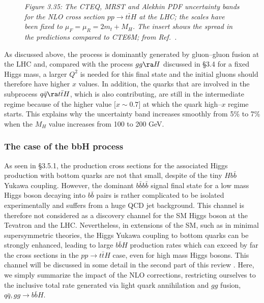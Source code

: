 \begin{figure}[h]
\begin{center}
\vspace*{-2.6cm}
\hspace*{-2cm}
\end{center}
\vspace*{-15.2cm}
{\it Figure 3.35: The CTEQ, MRST and Alekhin PDF uncertainty bands for the NLO
cross section $pp\to t \bar t H$ at the LHC; the scales have been fixed to
$\mu_F=\mu_R= 2m_t+M_H$. The insert shows the spread in the predictions 
compared to CTE6M; from Ref.~\cite{Samir}.}
\vspace*{-4mm} 
\end{figure}

As discussed above, the process is dominantly generated by gluon--gluon 
fusion at the LHC and, compared with the  process $gg  \ra H$ discussed in 
\S3.4 for a fixed  Higgs mass, a larger $Q^2$ is needed for this final 
state and the initial gluons should therefore have higher $x$ values. In
addition, the quarks that are involved in the subprocess $q\bar{q}\ra
t\bar{t}H$, which is also contributing,  are still in  the intermediate regime
because of the higher value $[x \sim 0.7$] at which the quark high--$x$ regime
starts.  This explains why the uncertainty band increases smoothly from 5\% to
7\% when the $M_H$ value increases from 100 to 200 GeV.  


\subsubsection{The case of the bbH process} 

As seen in \S3.5.1, the production cross sections for the associated Higgs
production with bottom quarks are not that small, despite of the tiny $Hb\bar
b$ Yukawa coupling.  However, the dominant $b\bar b b\bar b$ signal final state
for a low mass Higgs boson decaying into $b\bar b$ pairs is rather complicated
to be isolated experimentally and suffers from a huge QCD jet background.  This
channel is therefore not considered as a discovery channel for the SM Higgs
boson at the Tevatron and the LHC.  Nevertheless, in extensions of the SM, such
as in minimal supersymmetric theories, the Higgs Yukawa coupling to bottom
quarks can be strongly enhanced, leading to large $b \bar b H$ production rates
which can exceed by far the cross sections in the $pp\to t\bar t H$ case, even
for high mass Higgs bosons. This channel will be discussed in some detail in
the second part of this review \cite{Tome2}. Here, we simply summarize the
impact of the NLO corrections, restricting ourselves to the inclusive total
rate generated via light quark annihilation and $gg$ fusion, $q\bar q, gg \to
b\bar b H$. \s

